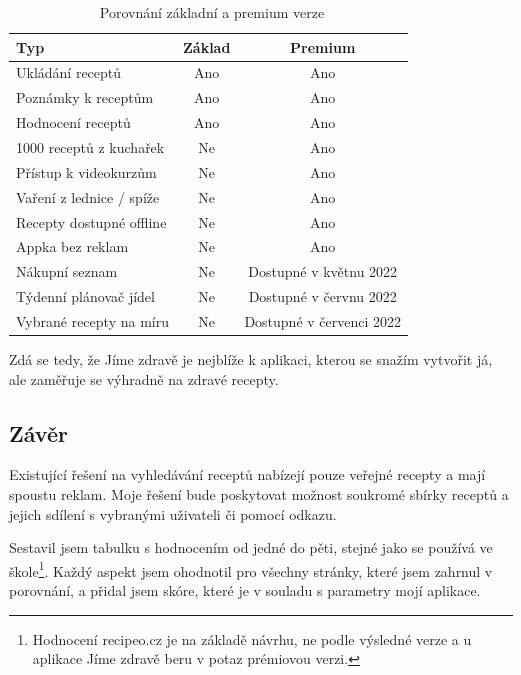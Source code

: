 \begin{table}[H]\centering
\caption{~Porovnání základní a premium verze}\label{tab:jimezdrave:zakladpremium}
\begin{tabular}{l|c|c}
    Typ		                                    & Základ    & Premium   \tabularnewline \hline
    Ukládání receptů		                    & Ano		& Ano       \tabularnewline \hline
    Poznámky k receptům	                        & Ano       & Ano       \tabularnewline \hline
    Hodnocení receptů	                        & Ano		& Ano       \tabularnewline \hline
    1000 receptů z kuchařek	                    & Ne		& Ano       \tabularnewline \hline
    Přístup k videokurzům	                    & Ne		& Ano       \tabularnewline \hline
    Vaření z lednice / spíže                    & Ne        & Ano       \tabularnewline \hline
    Recepty dostupné offline                    & Ne        & Ano       \tabularnewline \hline
    Appka bez reklam                            & Ne        & Ano       \tabularnewline \hline
    Nákupní seznam                              & Ne        & Dostupné v květnu 2022    \tabularnewline \hline
    Týdenní plánovač jídel                      & Ne        & Dostupné v červnu 2022    \tabularnewline \hline
    Vybrané recepty na míru                     & Ne        & Dostupné v červenci 2022  \tabularnewline
\end{tabular}
\end{table}

Zdá se tedy, že Jíme zdravě je nejblíže k aplikaci, kterou se snažím vytvořit já, ale zaměřuje se výhradně na zdravé recepty.

\subsection{Závěr}

Existující řešení na vyhledávání receptů nabízejí pouze veřejné recepty a mají spoustu reklam. Moje řešení bude poskytovat
možnost soukromé sbírky receptů a jejich sdílení s vybranými uživateli či pomocí odkazu.

Sestavil jsem tabulku s hodnocením od jedné do pěti, stejné jako se používá ve škole\footnote{Hodnocení recipeo.cz je na základě návrhu, ne podle výsledné verze a u aplikace Jíme zdravě beru v potaz prémiovou verzi.}.
Každý aspekt jsem ohodnotil pro všechny stránky, které jsem zahrnul v porovnání, a přidal jsem skóre, které je v souladu s parametry mojí aplikace.

\newcommand*\rot{\rotatebox{90}}

